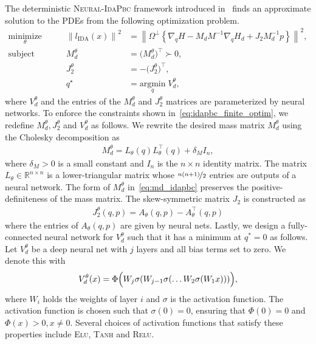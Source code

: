 The deterministic \textsc{Neural-IdaPbc} framework introduced
in~\cite{sirichotiyakul2022data} finds an approximate solution to the PDEs from the
following optimization problem.
\begin{equation}
  \begin{aligned}
      \underset{\theta }{\textrm{minimize}} 
      &&\quad \left\| l_{\textrm{IDA}} (x) \right\|^2 &= \left\| \Omega^\perp \left\{ \nabla_qH - M_dM^{-1} \nabla_qH_d + J_2M_d^{-1}p \right\} \right\|^2, \\
      \textrm{subject to}
      &&\quad M_d^\theta &= \big( M_d^\theta \big)^\top \succ 0, \\
      &&\quad J_2^\theta &= -\big( J_2^\theta \big)^\top, \\
      &&\quad q^\star &= \underset{q}{\textrm{argmin}}\; V_d^\theta,
  \end{aligned}    
  \label{eq:idapbc_finite_optim}%
\end{equation}
where $V^\theta_d$ and the entries of the $M^\theta_d$ and $J^\theta_2$ matrices
are parameterized by neural networks. 
%
To enforce the constraints shown in~\eqref{eq:idapbc_finite_optim}, we redefine
$M^\theta_d, J^\theta_2$ and $V^\theta_d$ as follows.
%
We rewrite the desired mass matrix $M^\theta_d$ using the Cholesky decomposition as
\begin{align}
  M^\theta_d = L_{\theta}(q)L_{\theta}^\top(q) + \delta_M I_n,
  \label{eq:md_idapbc}
\end{align}
\noindent where $\delta_M > 0$ is a small constant and $I_n$ is the $n \times n$
identity matrix.
%
The matrix $L_{\theta} \in \mathbb{R}^{n \times n}$ is a lower-triangular matrix
whose $\nicefrac{n(n+1)}{2}$ entries are outputs of a neural network. 
%
The form of $M_d^\theta$ in~\eqref{eq:md_idapbc} preserves the
positive-definiteness of the mass matrix.
%
The skew-symmetric matrix $J_2$ is constructed as 
\begin{align*}
  J_2^\theta(q, p) = A_\theta(q, p) - A^\top_\theta(q, p)
\end{align*}
\noindent where the entries of $A_{\theta}(q, p)$ are given by neural nets.
%
Lastly, we design a fully-connected neural network for $V^\theta_d$ such that it
has a minimum at $q^*=0$ as follows.
%
Let $V^\theta_d$ be a deep neural net with $j$ layers and all bias terms set to
zero. We denote this with
\begin{equation}
  V_d^\theta(x) = \Phi \Bigl( W_j\sigma(W_{j-1}\sigma(\ldots W_2\sigma(W_1x))) \Bigr),
  \label{eq:Vdnet_constraint}
\end{equation}
\noindent where $W_i$ holds the weights of layer $i$ and $\sigma$ is the activation function.
%
The activation function is chosen such that $\sigma(0) = 0$, ensuring that
$\Phi(0) = 0$ and $\Phi(x) > 0, x \ne 0$.
%
Several choices of activation functions that satisfy these properties include
\textsc{Elu}, \textsc{Tanh} and \textsc{Relu}.
%


